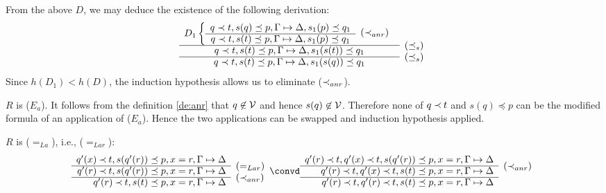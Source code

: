 \begin{PROOF}
\begin{LS}
From the above  $D$, we may deduce the existence of the following derivation:
\[ \begin{array}{cl}
D_1\left\{
\begin{array}{cl}
 q\prec t,s(q)\preceq p,\Gamma \Seq \Delta,s_1(p)\preceq q_1
         & \raisebox{-1.2ex}[1.5ex][0ex]{$(\Incl_{anr})$} \\ \cline{1-1}
 q\prec t,s(t)\preceq p,\Gamma \Seq \Delta,s_1(p)\preceq q_1
\end{array} \right. \\ \cline{1-1}
 q\prec t,s(t)\preceq p,\Gamma \Seq \Delta, s_1(s(t))\preceq q_1
         & \raisebox{1.2ex}[1.5ex][0ex]{$(\preceq_s)$} \\ \cline{1-1}
 q\prec t,s(t)\preceq p,\Gamma \Seq \Delta, s_1(s(q))\preceq q_1
         & \raisebox{1.2ex}[1.5ex][0ex]{$(\preceq_s)$}
\end{array}  \]
Since $h(D_1) < h(D)$, the induction hypothesis allows us to eliminate 
($\mathbin{\prec}_{anr}$).
\item $R$ is ($E_a$). It follows from the definition \ref{de:anr} that
$q\not\in\cal V$ and hence $s(q)\not\in\cal V$. Therefore none of $q\mathbin{\prec} t$
and $s(q)\preceq p$ can be the modified formula of an application of ($E_a$).
Hence the two applications can be swapped and induction hypothesis applied.
%
\item\label{it:eqLa} $R$ is ($=_{La}$), i.e., ($=_{Lar}$):
\[ \begin{array}{rl}
q'(x)\Incl t, s(q'(r))\preceq p, x=r, \Gamma\Seq\Delta \\ \cline{1-1}
q'(r)\Incl t, s(q'(r))\preceq p, x=r, \Gamma\Seq\Delta  &
\raisebox{1.2ex}[1.5ex][0ex]{$(=_{Lar})$} \\ \cline{1-1}
q'(r)\Incl t, s(t)\preceq p, x=r, \Gamma\Seq\Delta  &
\raisebox{1.2ex}[1.5ex][0ex]{$(\Incl_{anr})$}
\end{array} \convd
 \begin{array}{rl}
q'(r)\Incl t, q'(x)\Incl t, s(q'(r))\preceq p, x=r, \Gamma\Seq\Delta \\ \cline{1-1}
q'(r)\Incl t, q'(x)\Incl t, s(t)\preceq p, x=r, \Gamma\Seq\Delta  &
\raisebox{1.2ex}[1.5ex][0ex]{$(\Incl_{anr})$} \\ \cline{1-1}
q'(r)\Incl t, q'(r)\Incl t, s(t)\preceq p, x=r, \Gamma\Seq\Delta  &

\end{array}\]
\end{LS}
\end{PROOF}
